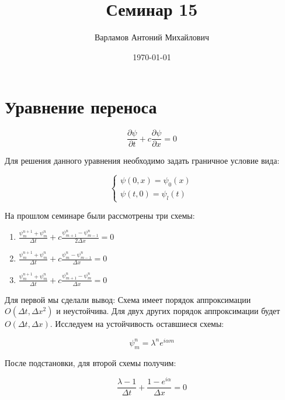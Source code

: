 \documentclass[10pt,a4paper]{article}
\title{Семинар 15}
\date{\today}
\author{Варламов Антоний Михайлович}
\begin{document}
	\maketitle
	
	\section{Уравнение переноса}
	
	\begin{equation}
		\frac{\partial \psi}{\partial t} + c\frac{\partial \psi}{\partial x} = 0
	\end{equation}
	
	Для решения данного уравнения необходимо задать граничное условие вида:
	
	\begin{equation}
		\begin{cases}
			\psi\left(0, x\right) = \psi_{0}\left(x\right)
			\\
			\psi\left(t, 0\right) = \psi_{l}\left(t\right)
		\end{cases}
	\end{equation}
	
	На прошлом семинаре были рассмотрены три схемы:
	
	\begin{enumerate}
		\item $
			\frac{\psi^{n + 1}_{m} + \psi_{m}^{n}}{\Delta t} +
			c\frac{\psi_{m + 1}^{n} - \psi_{m - 1}^{n}}{2\Delta x} = 0
		$
		\item $
			\frac{\psi^{n + 1}_{m} + \psi_{m}^{n}}{\Delta t} + 
			c\frac{\psi_{m}^{n} - \psi_{m - 1}^{n}}{\Delta x} = 0
		$
		\item $
			\frac{\psi^{n + 1}_{m} + \psi_{m}^{n}}{\Delta t} + 
			c\frac{\psi_{m + 1}^{n} - \psi_{m}^{n}}{\Delta x} = 0
		$
		
	\end{enumerate}
	
	Для первой мы сделали вывод: Схема имеет порядок аппроксимации $O
	\left(\Delta t, \Delta x^{2}\right)$ и неустойчива. Для двух других порядок 
	аппроксимации будет $O\left(\Delta t, \Delta x\right)$. Исследуем на 
	устойчивость оставшиеся схемы:
	
	\begin{equation}
		\psi_{m}^{n} = \lambda^{n}e^{i\alpha m}
	\end{equation}
	
	После подстановки, для второй схемы получим:
	
	\begin{equation}
		\frac{\lambda - 1}{\Delta t} + \frac{1 - e^{i\alpha}}{\Delta x} = 0
	\end{equation}
	
\end{document}
